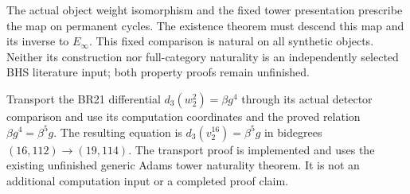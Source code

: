 \begin{theorem}
  \label{thm:main-weight-shift-naturality}
  \notready
  The actual object weight isomorphism and the fixed tower presentation
  prescribe the map on permanent cycles. The existence theorem
  must descend this map and its inverse to $E_\infty$. This fixed comparison
  is natural on all synthetic objects. Neither its
  construction nor full-category naturality is an independently selected
  BHS literature input; both property proofs remain unfinished.
\end{theorem}

\begin{theorem}
  \label{thm:main-tmf-br21-coordinate-differential}
  \notready
  Transport the BR21 differential
  $d_3(w_2^2)=\beta g^4$ through its actual detector comparison and use
  its computation coordinates and the proved relation
  $\beta g^4=\beta^5g$. The resulting equation is
  $d_3(v_2^{16})=\beta^5g$ in bidegrees
  $(16,112)\to(19,114)$. The transport proof is implemented and uses the
  existing unfinished generic Adams tower naturality theorem. It is not
  an additional computation input or a completed proof claim.
\end{theorem}
